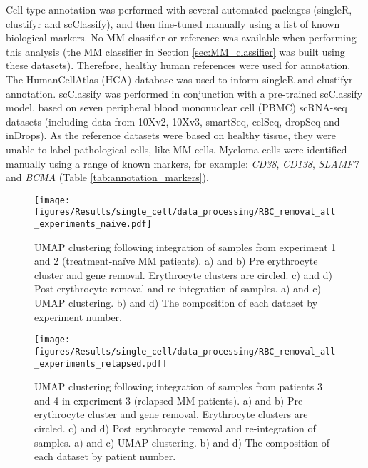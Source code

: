 Cell type annotation was performed with several automated packages (singleR, clustifyr and scClassify), and then fine-tuned manually using a list of known biological markers.
No MM classifier or reference was available when performing this analysis (the MM classifier in Section \ref{sec:MM_classifier} was built using these datasets).
Therefore, healthy human references were used for annotation.
The HumanCellAtlas (HCA) database was used to inform singleR and clustifyr annotation.
scClassify was performed in conjunction with a pre-trained scClassify model, based on seven peripheral blood mononuclear cell (PBMC) scRNA-seq datasets (including data from 10Xv2, 10Xv3, smartSeq, celSeq, dropSeq and inDrops).
As the reference datasets were based on healthy tissue, they were unable to label pathological cells, like MM cells.
Myeloma cells were identified manually using a range of known markers, for example: \textit{CD38}, \textit{CD138}, \textit{SLAMF7} and \textit{BCMA} (Table \ref{tab:annotation_markers}).

\begin{figure}[htb]
    \centering
    \texttt{[image: figures/Results/single\_cell/data\_processing/RBC\_removal\_all\_experiments\_naive.pdf]}
    \caption[Erythrocyte removal- newly diagnosed MM]{UMAP clustering following integration of samples from experiment 1 and 2 (treatment-na\"ive MM patients).
    a) and b) Pre erythrocyte cluster and gene removal. Erythrocyte clusters are circled.
    c) and d) Post erythrocyte removal and re-integration of samples.
    a) and c) UMAP clustering.
    b) and d) The composition of each dataset by experiment number.}
    \label{fig:umap_RBC_naive}
\end{figure}

\begin{figure}[htb]
    \centering
    \texttt{[image: figures/Results/single\_cell/data\_processing/RBC\_removal\_all\_experiments\_relapsed.pdf]}
    \caption[Erythrocyte removal- relapsed MM]{UMAP clustering following integration of samples from patients 3 and 4 in experiment 3 (relapsed MM patients).
    a) and b) Pre erythrocyte cluster and gene removal. Erythrocyte clusters are circled.
    c) and d) Post erythrocyte removal and re-integration of samples.
    a) and c) UMAP clustering.
    b) and d) The composition of each dataset by patient number.}
    \label{fig:umap_RBC_relapsed}
\end{figure}

